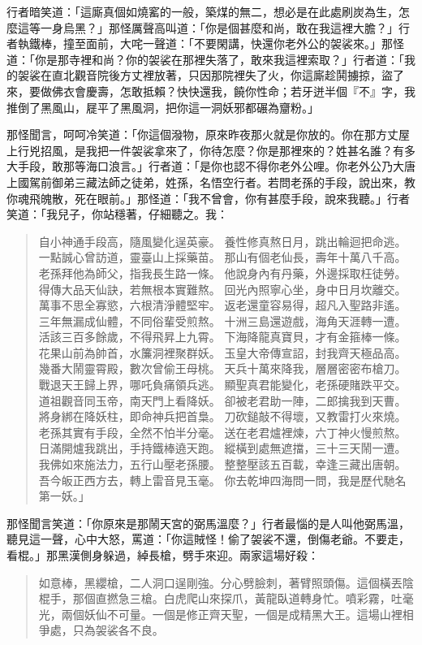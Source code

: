 行者暗笑道：「這廝真個如燒窰的一般，築煤的無二，想必是在此處刷炭為生，怎麼這等一身烏黑？」那怪厲聲高叫道：「你是個甚麼和尚，敢在我這裡大膽？」行者執鐵棒，撞至面前，大咤一聲道：「不要閑講，快還你老外公的袈裟來。」那怪道：「你是那寺裡和尚？你的袈裟在那裡失落了，敢來我這裡索取？」行者道：「我的袈裟在直北觀音院後方丈裡放著，只因那院裡失了火，你這廝趁鬨擄掠，盜了來，要做佛衣會慶壽，怎敢抵賴？快快還我，饒你性命；若牙迸半個『不』字，我推倒了黑風山，屣平了黑風洞，把你這一洞妖邪都碾為齏粉。」

那怪聞言，呵呵冷笑道：「你這個潑物，原來昨夜那火就是你放的。你在那方丈屋上行兇招風，是我把一件袈裟拿來了，你待怎麼？你是那裡來的？姓甚名誰？有多大手段，敢那等海口浪言。」行者道：「是你也認不得你老外公哩。你老外公乃大唐上國駕前御弟三藏法師之徒弟，姓孫，名悟空行者。若問老孫的手段，說出來，教你魂飛魄散，死在眼前。」那怪道：「我不曾會，你有甚麼手段，說來我聽。」行者笑道：「我兒子，你站穩著，仔細聽之。我：
\begin{quote}
自小神通手段高，隨風變化逞英豪。
養性修真熬日月，跳出輪迴把命逃。
一點誠心曾訪道，靈臺山上採藥苗。
那山有個老仙長，壽年十萬八千高。
老孫拜他為師父，指我長生路一條。
他說身內有丹藥，外邊採取枉徒勞。
得傳大品天仙訣，若無根本實難熬。
回光內照寧心坐，身中日月坎離交。
萬事不思全寡慾，六根清淨體堅牢。
返老還童容易得，超凡入聖路非遙。
三年無漏成仙體，不同俗輩受煎熬。
十洲三島還遊戲，海角天涯轉一遭。
活該三百多餘歲，不得飛昇上九霄。
下海降龍真寶貝，才有金箍棒一條。
花果山前為帥首，水簾洞裡聚群妖。
玉皇大帝傳宣詔，封我齊天極品高。
幾番大鬧靈霄殿，數次曾偷王母桃。
天兵十萬來降我，層層密密布槍刀。
戰退天王歸上界，哪吒負痛領兵逃。
顯聖真君能變化，老孫硬賭跌平交。
道祖觀音同玉帝，南天門上看降妖。
卻被老君助一陣，二郎擒我到天曹。
將身綁在降妖柱，即命神兵把首梟。
刀砍鎚敲不得壞，又教雷打火來燒。
老孫其實有手段，全然不怕半分毫。
送在老君爐裡煉，六丁神火慢煎熬。
日滿開爐我跳出，手持鐵棒遶天跑。
縱橫到處無遮擋，三十三天鬧一遭。
我佛如來施法力，五行山壓老孫腰。
整整壓該五百載，幸逢三藏出唐朝。
吾今皈正西方去，轉上雷音見玉毫。
你去乾坤四海問一問，我是歷代馳名第一妖。」
\end{quote}

那怪聞言笑道：「你原來是那鬧天宮的弼馬溫麼？」行者最惱的是人叫他弼馬溫，聽見這一聲，心中大怒，罵道：「你這賊怪！偷了袈裟不還，倒傷老爺。不要走，看棍。」那黑漢側身躲過，綽長槍，劈手來迎。兩家這場好殺：
\begin{quote}
如意棒，黑纓槍，二人洞口逞剛強。分心劈臉刺，著臂照頭傷。這個橫丟陰棍手，那個直撚急三槍。白虎爬山來探爪，黃龍臥道轉身忙。噴彩霧，吐毫光，兩個妖仙不可量。一個是修正齊天聖，一個是成精黑大王。這場山裡相爭處，只為袈裟各不良。
\end{quote}

